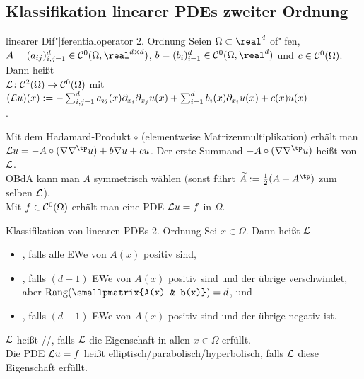 \pagebreak

\subsection{%
    Klassifikation linearer PDEs zweiter Ordnung%
}

\begin{Def}{linearer Dif"|ferentialoperator 2. Ordnung}
    Seien $\Omega \subset \real^d$ of"|fen,\\
    $A = (a_{ij})_{i,j=1}^d \in \C^0(\Omega, \real^{d \times d})$,
    $b = (b_i)_{i=1}^d \in \C^0(\Omega, \real^d)$ und $c \in \mathcal{C}^0(\Omega)$.
    Dann heißt\\
    $\mathcal{L}\colon \mathcal{C}^2(\Omega) \to \mathcal{C}^0(\Omega)$ mit
    $(\mathcal{L} u)(x) := -\sum_{i,j=1}^d a_{ij}(x) \partial_{x_i} \partial_{x_j} u(x) +
    \sum_{i=1}^d b_i(x) \partial_{x_i} u(x) + c(x) u(x)$\\
    .
\end{Def}

\begin{Bem}
    Mit dem Hadamard-Produkt $\circ$ (elementweise Matrizenmultiplikation) erhält man
    $\L u = -A \circ (\nabla \nabla^\tp u) + b \nabla u + cu$.
    Der erste Summand
    $-A \circ (\nabla \nabla^\tp u)$ heißt  von $\mathcal{L}$.\\
    OBdA kann man $A$ symmetrisch wählen (sonst führt $\widetilde{A} := \frac{1}{2} (A + A^\tp)$
    zum selben $\mathcal{L}$).\\
    Mit $f \in \mathcal{C}^0(\Omega)$ erhält man eine PDE $\mathcal{L} u = f$ in $\Omega$.
\end{Bem}

\linie

\begin{Def}{Klassifikation von linearen PDEs 2. Ordnung}
    Sei $x \in \Omega$.
    Dann heißt $\mathcal{L}$
    \begin{itemize}
        \item
        ,
        falls alle EWe von $A(x)$ positiv sind,

        \item
        ,
        falls $(d - 1)$ EWe von $A(x)$ positiv sind und der übrige verschwindet,
        aber $\Rang(\smallpmatrix{A(x) & b(x)}) = d$, und

        \item
        ,
        falls $(d - 1)$ EWe von $A(x)$ positiv sind und der übrige negativ ist.
    \end{itemize}
    $\mathcal{L}$ heißt //,
    falls $\mathcal{L}$ die Eigenschaft in allen $x \in \Omega$ erfüllt.\\
    Die PDE $\mathcal{L} u = f$ heißt elliptisch/parabolisch/hyperbolisch,
    falls $\mathcal{L}$ diese Eigenschaft erfüllt.
\end{Def}

